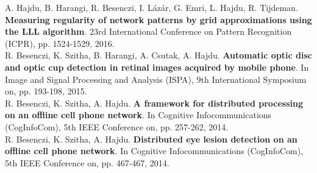 \documentclass[b5paper,12pt]{report}
\theoremstyle{definition}
\begin{document}
\begin{singlespace}
\noindent
A. Hajdu, B. Harangi, R. Besenczi, I. Lázár, G. Emri, L. Hajdu, R. Tijdeman. {\bf{Measuring regularity of network patterns by grid approximations using the LLL algorithm}}. 23rd International Conference on Pattern Recognition (ICPR), pp. 1524-1529, 2016.
\\[10pt]
\noindent
R. Besenczi, K. Szitha, B. Harangi, A. Csutak, A. Hajdu. {\bf{Automatic optic disc and optic cup detection in retinal images acquired by mobile phone}}. In Image and Signal Processing and Analysis (ISPA), 9th International Symposium on, pp. 193-198, 2015.
\\[10pt]
\noindent
R. Besenczi, K. Szitha, A. Hajdu. {\bf{A framework for distributed processing on an offline cell phone network}}. In Cognitive Infocommunications (CogInfoCom), 5th IEEE Conference on, pp. 257-262, 2014.
\\[10pt]
\noindent
R. Besenczi, K. Szitha, A. Hajdu. {\bf{Distributed eye lesion detection on an offline cell phone network}}. In Cognitive Infocommunications (CogInfoCom), 5th IEEE Conference on, pp. 467-467, 2014.

\end{singlespace}
\end{document}
